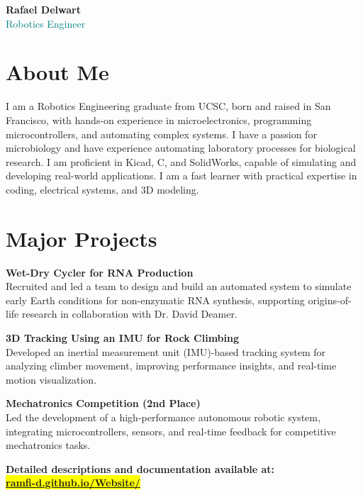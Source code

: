 \documentclass[a4paper,9pt]{article}
\begin{document}
\begin{center}
    {\Large \textbf{Rafael Delwart}} \\
    {\small \textcolor{teal}{Robotics Engineer}} \\
    \vspace{0.3em}
\end{center}

\section*{About Me}
 I am a Robotics Engineering graduate from UCSC, born and raised in San Francisco,
with hands-on experience in microelectronics, programming microcontrollers,
and automating complex systems. I have a passion for microbiology and have experience automating laboratory processes for biological research. 
I am proficient in Kicad, C, and SolidWorks, capable of simulating and developing real-world applications. I am a fast learner with practical expertise in coding, electrical systems, and 3D modeling.\normalsize

\section*{Major Projects}

\small 

\textbf{Wet-Dry Cycler for RNA Production} \\
Recruited and led a team to design and build an automated system to simulate early Earth conditions for non-enzymatic RNA synthesis, supporting origins-of-life research in collaboration with Dr. David Deamer.

\textbf{3D Tracking Using an IMU for Rock Climbing} \\
Developed an inertial measurement unit (IMU)-based tracking system for analyzing climber movement, improving performance insights, and real-time motion visualization.

\textbf{Mechatronics Competition (2nd Place)} \\
Led the development of a high-performance autonomous robotic system, integrating microcontrollers, sensors, and real-time feedback for competitive mechatronics tasks.

\textbf{Detailed descriptions and documentation available at:} \\
\colorbox{yellow}{\href{https://ramfi-d.github.io/Website/}{\textbf{ramfi-d.github.io/Website/}}}
\end{document}
